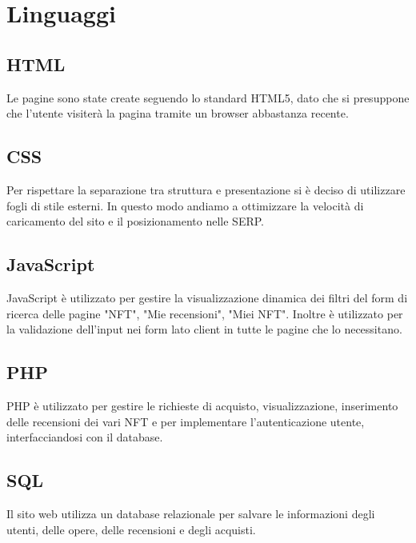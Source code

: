\documentclass[10pt]{article}
\begin{document}
\section{Linguaggi}
\subsection{HTML}
Le pagine sono state create seguendo lo standard HTML5, dato che si presuppone che l'utente visiterà la pagina tramite un browser abbastanza recente.
\subsection{CSS}
Per rispettare la separazione tra struttura e presentazione si è deciso di utilizzare fogli di stile esterni. In questo modo andiamo a ottimizzare la velocità di caricamento del sito e il posizionamento nelle SERP.
\subsection{JavaScript}
JavaScript è utilizzato per gestire la visualizzazione dinamica dei filtri del form di ricerca delle pagine "NFT", "Mie recensioni", "Miei NFT".
Inoltre è utilizzato per la validazione dell'input nei form lato client in tutte le pagine che lo necessitano.
\subsection{PHP} 
PHP è utilizzato per gestire le richieste di acquisto, visualizzazione, inserimento delle recensioni dei vari NFT e per implementare l'autenticazione utente, interfacciandosi con il database.
\subsection{SQL}
Il sito web utilizza un database relazionale per salvare le informazioni degli utenti, delle opere, delle recensioni e degli acquisti.
\end{document}
